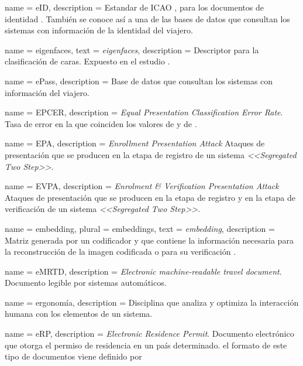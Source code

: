 {
    name        = {eID},
    description = {Estandar de ICAO \cite{ICAOOnline}, para los documentos de identidad \cite{doc20069303}. También se conoce así a una de las bases de datos que consultan los sistemas  con información de la identidad del viajero.}
}

{
    name        = {eigenfaces},
    text        = \textit{eigenfaces},
    description = {Descriptor para la clasificación de caras. Expuesto en el estudio \cite{turk1991face}.}
}

{
    name        = {ePass},
    description = {Base de datos que consultan los sistemas  con información del viajero.}
}

{
    name        = {EPCER},
    description = {\textit{Equal Presentation Classification Error Rate}. Tasa de error en la que coinciden los valores de  y de .}
}

{
    name        = {EPA},
    description = {\textit{Enrollment Presentation Attack} Ataques de presentación que se producen en la etapa de registro de un sistema  \textit{<<Segregated Two Step>>}.}
}

{
    name        = {EVPA},
    description = {\textit{Enrolment \& Verification Presentation Attack} Ataques de presentación que se producen en la etapa de registro y en la etapa de verificación de un sistema  \textit{<<Segregated Two Step>>}.}
}

{
    name        = {embedding},
    plural      = {embeddings},
    text        = \textit{embedding},
    description = {Matriz generada por un codificador  y que contiene la información necesaria para la reconstrucción de la imagen codificada o para su verificación \cite{schroff2015facenet}.}
}

{
    name        = {eMRTD},
    description = {\textit{Electronic machine-readable travel document}. Documento legible por sistemas automáticos.}
}

{
    name        = {ergonomía},
    description = {Disciplina que analiza y optimiza la interacción humana con los elementos de un sistema.}
}

{
    name        = {eRP},
    description = {\textit{Electronic Residence Permit}. Documento electrónico que otorga el permiso de residencia en un país determinado. el formato de este tipo de documentos viene definido por  \cite{ICAOOnline}}
}

